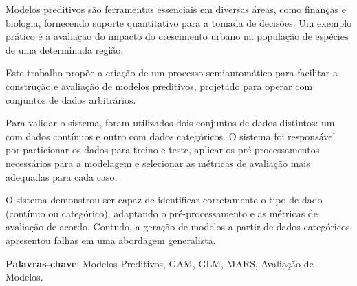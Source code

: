\documentclass[
    12pt,               %
    openright,          %
    oneside,            %
    a4paper,            %
    english,            %
    brazil              %
    ]{abntex2}
\begin{document}
\setlength{\absparsep}{18pt} %
\begin{resumo}
    Modelos preditivos são ferramentas essenciais em diversas áreas, como finanças e biologia, 
    fornecendo suporte quantitativo para a tomada de decisões. Um exemplo prático é a avaliação 
    do impacto do crescimento urbano na população de espécies de uma determinada região.

    Este trabalho propõe a criação de um processo semiautomático para facilitar a construção e 
    avaliação de modelos preditivos, projetado para operar com conjuntos de dados arbitrários.

    Para validar o sistema, foram utilizados dois conjuntos de dados distintos: um com dados 
    contínuos e outro com dados categóricos. O sistema foi responsável por particionar os dados 
    para treino e teste, aplicar os pré-processamentos necessários para a modelagem e 
    selecionar as métricas de avaliação mais adequadas para cada caso.

    O sistema demonstrou ser capaz de identificar corretamente o tipo de dado (contínuo ou categórico), 
    adaptando o pré-processamento e as métricas de avaliação de acordo. Contudo, a geração de modelos 
    a partir de dados categóricos apresentou falhas em uma abordagem generalista.

\textbf{Palavras-chave}: Modelos Preditivos, GAM, GLM, MARS, Avaliação de Modelos.
\end{resumo}
\end{document}
